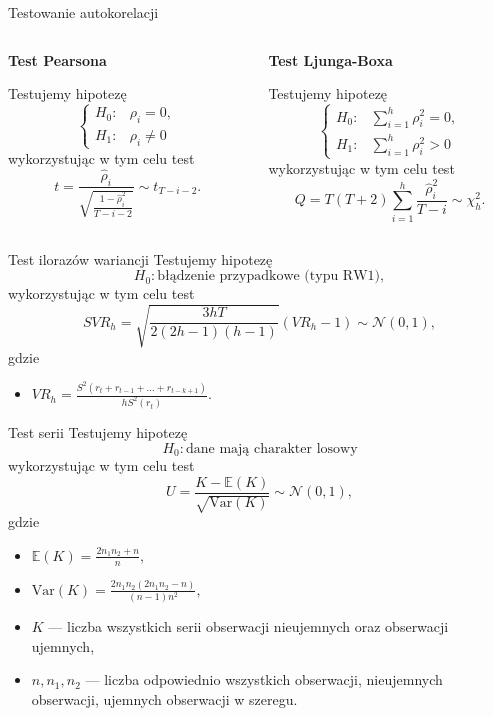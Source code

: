 \documentclass[a4paper, 11pt]{beamer}
\begin{document}
	\begin{frame}{Testowanie autokorelacji}
		\begin{columns}
			\begin{column}{0.5\textwidth}
				\begin{center}
					\textbf{Test Pearsona}
				\end{center}
				Testujemy hipotezę \[
					\begin{cases}
						H_{0}: & \rho_{i}=0,\\
						H_{1}: & \rho_{i}\neq0
					\end{cases}
				\]
				wykorzystując w tym celu test \[
					t=\frac{\hat{\rho}_i}{\sqrt{\frac{1-\hat{\rho}^2_i}{T-i-2}}} \sim t_{T-i-2}.
				\]
			\end{column}
			\begin{column}{0.5\textwidth}
				\begin{center}
					\textbf{Test Ljunga-Boxa}
				\end{center}
				Testujemy hipotezę \[
					\begin{cases}
						H_{0}: & \sum_{i=1}^{h} \rho_{i}^{2}=0,\\
						H_{1}: & \sum_{i=1}^{h} \rho_{i}^{2}>0
					\end{cases}
				\]
				wykorzystując w tym celu test \[
					Q = T \left(T + 2\right) \sum_{i=1}^h \frac{\hat{\rho}^2_i}{T-i} \sim \chi^2_{h}.
				\]
			\end{column}
		\end{columns}
	\end{frame}
	
	\begin{frame}{Test ilorazów wariancji}
		Testujemy hipotezę \[
				H_{0}: \mbox{błądzenie przypadkowe (typu RW1)},
		\] wykorzystując w tym celu test \[
			SVR_h = \sqrt{\frac{3hT}{2\left(2h-1\right)\left(h-1\right)}} \left(VR_h - 1\right) \sim \mathcal{N}\left(0,1\right),
		\] gdzie
		\begin{itemize}
			\item $VR_h = \frac{S^2\left(r_t+r_{t-1}+\ldots+r_{t-k+1}\right)}{hS^2\left(r_t\right)}.$
		\end{itemize}
	\end{frame}
	
	\begin{frame}{Test serii}
		Testujemy hipotezę \[
				H_{0}: \mbox{dane mają charakter losowy}
		\] wykorzystując w tym celu test \[
			U=\frac{K-\mathbb{E}\left(K\right)}{\sqrt{\mbox{Var}\left(K\right)}} \sim \mathcal{N}\left(0,1\right),
		\] gdzie
		\begin{itemize}
			\item $\mathbb{E}\left(K\right) = \frac{2 n_1 n_2 + n}{n},$
			\item $\mbox{Var}\left(K\right) = \frac{2 n_1 n_2 \left(2 n_1 n_2 - n\right)}{\left(n - 1\right) n^2},$
			\item $K$ --- liczba wszystkich serii obserwacji nieujemnych oraz obserwacji ujemnych,
			\item $n, n_1, n_2$ --- liczba odpowiednio wszystkich obserwacji, nieujemnych obserwacji, ujemnych obserwacji w szeregu.
		\end{itemize}
	\end{frame}
	
\end{document}
